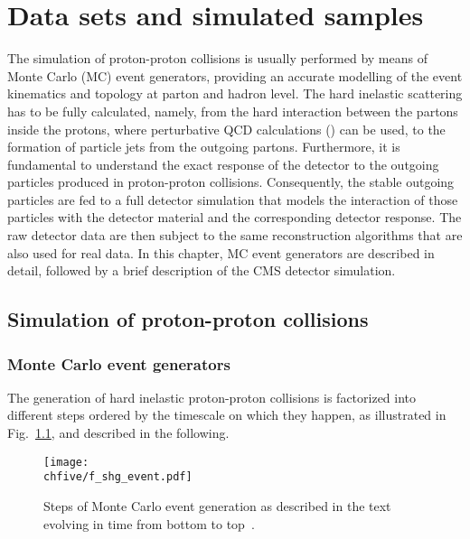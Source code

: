 \chapter{Data sets and simulated samples}
\label{ch:dataAndSim}

The simulation of proton-proton collisions is usually performed by means of Monte Carlo (MC) event generators, providing an accurate modelling of the event kinematics and topology at parton and hadron level.
The hard inelastic scattering has to be fully calculated, namely, from the hard interaction between the partons inside the protons, where perturbative QCD calculations () can be used, to the formation of particle jets from the outgoing partons.
Furthermore, it is fundamental to understand the exact response of the detector to the outgoing particles produced in proton-proton collisions. 
Consequently, the stable outgoing particles are fed to a full detector simulation that models the interaction of those particles with the detector material and the corresponding detector response.
The raw detector data are then subject to the same reconstruction algorithms that are also used for real data.
In this chapter, MC event generators are described in detail, followed by a brief description of the CMS detector simulation.

\section{Simulation of proton-proton collisions}

\subsection{Monte Carlo event generators}

The generation of hard inelastic proton-proton collisions is factorized into different steps ordered by the timescale on which they happen, as illustrated in Fig.~\ref{fig:MCgenSteps}, and described in the following.\\

\begin{figure}[!htb]
\centering
\texttt{[image: \\chfive/f\_shg\_event.pdf]}
\caption{Steps of Monte Carlo event generation as described in the text evolving in time from bottom to top~\cite{Dobbs:2004qw}.}
\label{fig:MCgenSteps}
\end{figure}

